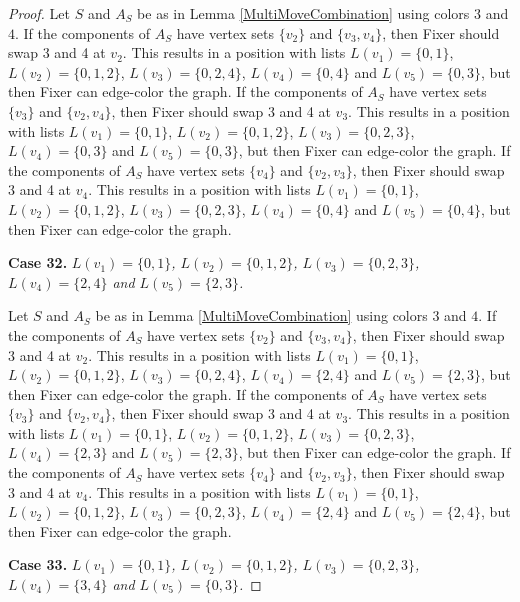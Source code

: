 \documentclass[12pt]{amsart}
\theoremstyle{plain}
\theoremstyle{definition}
\theoremstyle{remark}
\begin{document}
\begin{proof}
Let $S$ and $A_S$ be as in Lemma \ref{MultiMoveCombination} using colors $3$ and $4$. If the components of $A_S$ have vertex sets $\{v_2\}$ and $\{v_3, v_4\}$, then Fixer should swap 3 and 4 at $v_2$. This results in a position with lists $L(v_1) = \{0, 1\}$, $L(v_2) = \{0, 1, 2\}$, $L(v_3) = \{0, 2, 4\}$, $L(v_4) = \{0, 4\}$ and $L(v_5) = \{0, 3\}$, but then Fixer can edge-color the graph.
If the components of $A_S$ have vertex sets $\{v_3\}$ and $\{v_2, v_4\}$, then Fixer should swap 3 and 4 at $v_3$. This results in a position with lists $L(v_1) = \{0, 1\}$, $L(v_2) = \{0, 1, 2\}$, $L(v_3) = \{0, 2, 3\}$, $L(v_4) = \{0, 3\}$ and $L(v_5) = \{0, 3\}$, but then Fixer can edge-color the graph.
If the components of $A_S$ have vertex sets $\{v_4\}$ and $\{v_2, v_3\}$, then Fixer should swap 3 and 4 at $v_4$. This results in a position with lists $L(v_1) = \{0, 1\}$, $L(v_2) = \{0, 1, 2\}$, $L(v_3) = \{0, 2, 3\}$, $L(v_4) = \{0, 4\}$ and $L(v_5) = \{0, 4\}$, but then Fixer can edge-color the graph.

\noindent\textbf{Case 32.  }\textit{$L(v_1) = \{0, 1\}$, $L(v_2) = \{0, 1, 2\}$, $L(v_3) = \{0, 2, 3\}$, $L(v_4) = \{2, 4\}$ and $L(v_5) = \{2, 3\}$.}

Let $S$ and $A_S$ be as in Lemma \ref{MultiMoveCombination} using colors $3$ and $4$. If the components of $A_S$ have vertex sets $\{v_2\}$ and $\{v_3, v_4\}$, then Fixer should swap 3 and 4 at $v_2$. This results in a position with lists $L(v_1) = \{0, 1\}$, $L(v_2) = \{0, 1, 2\}$, $L(v_3) = \{0, 2, 4\}$, $L(v_4) = \{2, 4\}$ and $L(v_5) = \{2, 3\}$, but then Fixer can edge-color the graph.
If the components of $A_S$ have vertex sets $\{v_3\}$ and $\{v_2, v_4\}$, then Fixer should swap 3 and 4 at $v_3$. This results in a position with lists $L(v_1) = \{0, 1\}$, $L(v_2) = \{0, 1, 2\}$, $L(v_3) = \{0, 2, 3\}$, $L(v_4) = \{2, 3\}$ and $L(v_5) = \{2, 3\}$, but then Fixer can edge-color the graph.
If the components of $A_S$ have vertex sets $\{v_4\}$ and $\{v_2, v_3\}$, then Fixer should swap 3 and 4 at $v_4$. This results in a position with lists $L(v_1) = \{0, 1\}$, $L(v_2) = \{0, 1, 2\}$, $L(v_3) = \{0, 2, 3\}$, $L(v_4) = \{2, 4\}$ and $L(v_5) = \{2, 4\}$, but then Fixer can edge-color the graph.

\noindent\textbf{Case 33.  }\textit{$L(v_1) = \{0, 1\}$, $L(v_2) = \{0, 1, 2\}$, $L(v_3) = \{0, 2, 3\}$, $L(v_4) = \{3, 4\}$ and $L(v_5) = \{0, 3\}$.}


\end{proof}
\end{document}
